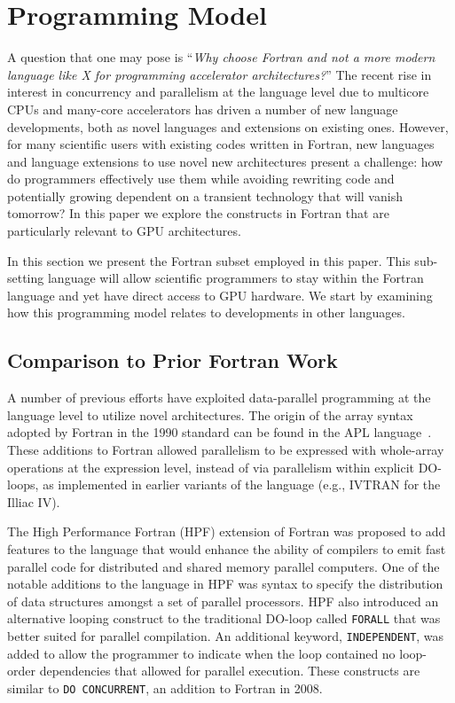 \section{Programming Model}

A question that one may pose is ``\emph{Why choose Fortran and not a
  more modern language like X for programming accelerator
  architectures?}''  The recent rise in interest in concurrency and
parallelism at the language level due to multicore CPUs and
many-core accelerators has driven a number of new language
developments, both as novel languages and extensions on existing ones.
However, for many scientific users with existing codes written in
Fortran, new languages and language extensions to use novel new
architectures present a challenge: how do programmers effectively use
them while avoiding rewriting code and potentially growing dependent
on a transient technology that will vanish tomorrow?  In this paper we
explore the constructs in Fortran that are particularly relevant to
GPU architectures.

In this section we present the Fortran subset employed in this paper.
This sub-setting language will allow scientific programmers to stay
within the Fortran language and yet have direct access to GPU
hardware.  We start by examining how this programming model relates to
developments in other languages.


\subsection{Comparison to Prior Fortran Work}



A number of previous efforts have exploited data-parallel programming
at the language level to utilize novel architectures.  The origin of
the array syntax adopted by Fortran in the 1990 standard can be found
in the APL language~\cite{iverson79apl}.  These additions to Fortran
allowed parallelism to be expressed with whole-array operations at the
expression level, instead of via parallelism within explicit DO-loops,
as implemented in earlier variants of the language (e.g., IVTRAN for the
Illiac IV).

The High Performance Fortran (HPF) extension of Fortran was proposed
to add features to the language that would enhance the ability of
compilers to emit fast parallel code for distributed and shared memory
parallel computers\cite{koelbel94hpf}.  One of the notable additions
to the language in HPF was syntax to specify the distribution of data
structures amongst a set of parallel processors.  HPF also introduced
an alternative looping construct to the traditional DO-loop called
{\tt FORALL} that was better suited for parallel compilation.  An
additional keyword, {\tt INDEPENDENT}, was added to allow the
programmer to indicate when the loop contained no loop-order
dependencies that allowed for parallel execution.  These constructs
are similar to {\tt DO CONCURRENT}, an addition to Fortran in 2008.

